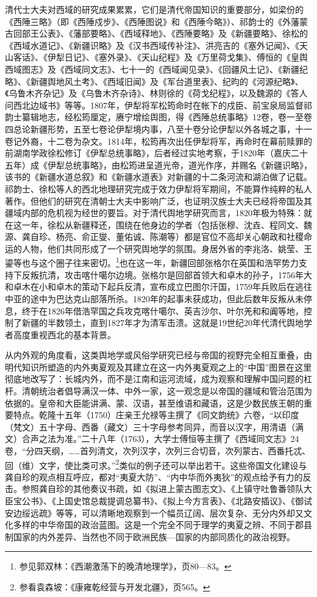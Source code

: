 \documentclass[a4paper, 12pt, openright]{ctexbook}
\begin{document}
清代士大夫对西域的研究成果累累，它们是清代帝国知识的重要部分，如梁份的《西陲三略》（即《西陲戍步》、《西陲图说》和《西陲今略》）、祁韵士的《外藩蒙古回部王公表》、《藩部要略》、《西域释地》、《西陲要略》及《新疆要略》、徐松的《西域水道记》、《新疆识略》及《汉书西域传补注》、洪亮吉的《塞外记闻》、《天山客话》、《伊犁日记》、《塞外录》、《天山纪程》及《万里荷戈集》、傅恒的《皇舆西域图志》及《西域同文志》、七十一的《西域闻见录》、《回疆风土记》、《新疆纪略》、《新疆舆地风土考》、《西域旧闻》及《军台道里表》、纪昀的《河源纪略》、《乌鲁木齐杂记》及《乌鲁木齐杂诗》、林则徐的《荷戈纪程》，以及魏源的《答人问西北边域书》等等。1807年，伊犁将军松筠命时在帐下的戍臣、前宝泉局监督祁韵士纂辑地志，经松筠厘定，赓宁增绘舆图，得《西陲总统事略》12卷，卷一至卷四总论新疆形势，五至七卷论伊犁境内事，八至十卷分论伊犁以外各城之事，十一卷记外裔，十二卷为杂文。1814年，松筠再次出任伊犁将军，再命时在幕前赎罪的前湖南学政徐松修订《伊犁总统事略》，后者经过实地考察，于1820年（嘉庆二十五年）成《伊犁总统事略》，由松筠进呈道光帝，道光作序，并赐名《新疆识略》，该书的《新疆水道总叙》和《新疆水道表》对新疆的十二条河流和湖泊做了记载。祁韵士、徐松等人的西北地理研究完成于效力伊犁将军期间，不能算作纯粹的私人著作。但他们的研究在清朝士大夫中影响广泛，也证明汉族士大夫已经将帝国及其疆域内部的危机视为经世的要旨。对于清代舆地学研究而言，1820年极为特殊：就在这一年，徐松从新疆释还，围绕在他身边的学者（包括张穆、沈垚、程同文、魏源、龚自珍、杨亮、俞正燮、董佑诚、陈潮等）都是官位不高却关心朝政和社稷命运的人物，他们共同形成了一个研究舆地学的氛围。身居外省的李兆洛、姚莹、王鎏等也与这个圈子往来密切。\footnote{参见郭双林：《西潮激荡下的晚清地理学》，页80—83。}也在这一年，新疆回部张格尔在英国和浩罕势力支持下反叛抗清，攻击喀什噶尔边境。张格尔是回部首领大和卓木的孙子，1756年大和卓木在小和卓木的策动下起兵反清，宣布成立巴图尔汗国，1759年兵败后在逃往中亚的途中为巴达克山部落所杀。1820年的起事未获成功，但此后数年反叛从未停息，终于在1826年借浩罕国之兵攻克喀什噶尔、英吉沙尔、叶尔羌和和阗等地，控制了新疆的半数领土，直到1827年才为清军击溃。这就是19世纪20年代清代舆地学者高度重视西北的基本背景。

从内外观的角度看，这类舆地学或风俗学研究已经与帝国的视野完全相互重叠，由明代知识所塑造的内外夷夏观及其建立在这一内外夷夏观之上的“中国”图景在这里彻底地改写了：长城内外，而不是江南和运河流域，成为观察和理解中国问题的杠杆。清朝统治者倡导满汉一体、中外一家，这一观念是以帝国的疆域和管治范围为依据的。皇帝和大臣能讲满、蒙、汉语，甚至维语和藏语，这是少数民族王朝的重要特点。乾隆十五年（1750）庄亲王允禄等主撰了《同文韵统》六卷，“以印度（梵文）五十字母、西番（藏文）三十字母参考同异，而音以汉字，用清语（满文）合声之法为准。”二十八年（1763），大学士傅恒等主撰了《西域同文志》24卷，“分四天纲，……首列清文，次列汉字，次列三合切音，次列蒙古、西番托忒、回（维）文字，使比类可求。”\footnote{参看袁森坡：《康雍乾经营与开发北疆》，页565。}类似的例子还可以举出若干。这些帝国文化建设与龚自珍的观点相互呼应，都对“夷夏大防”、“内中华而外夷狄”的观点给予有力的反击。参照龚自珍的其他奏议书疏，如《拟进上蒙古图志文》、《上镇守吐鲁番领队大臣宝公书》、《上国史馆总裁提调总纂书》、《拟上今方言表》、《北路安插议》、《御试安边绥远疏》等等，可以清晰地观察到一个幅员辽阔、层次复杂、无分内外却又文化多样的中华帝国的政治蓝图。这是一个完全不同于理学的夷夏之辨、不同于郡县制国家的内外差异、当然也不同于欧洲民族—国家的内部同质化的政治视野。
\end{document}
